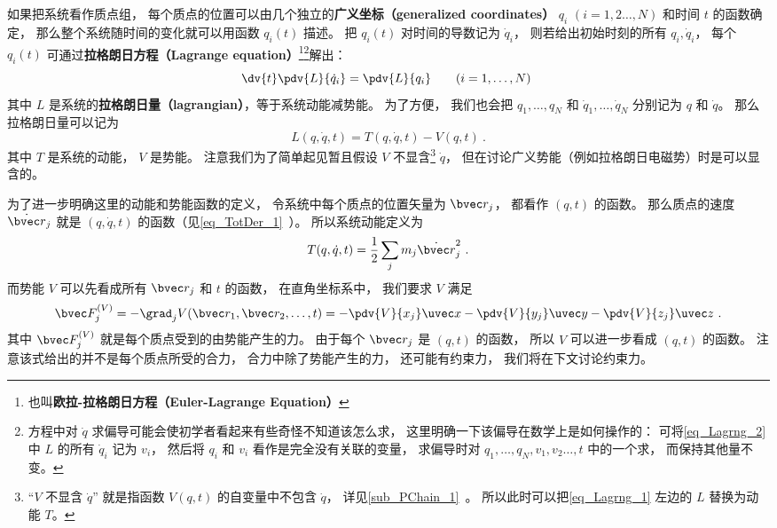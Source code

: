 

如果把系统看作质点组， 每个质点的位置可以由几个独立的\textbf{广义坐标（generalized coordinates）} $q_i$ $(i=1,2\dots,N)$ 和时间 $t$ 的函数确定， 那么整个系统随时间的变化就可以用函数 $q_i(t)$ 描述。 把 $q_i(t)$ 对时间的导数记为 $\dot q_i$， 则若给出初始时刻的所有 $q_i, \dot q_i$， 每个 $q_i(t)$ 可通过\textbf{拉格朗日方程（Lagrange equation）}\footnote{也叫\textbf{欧拉-拉格朗日方程（Euler-Lagrange Equation）}}\footnote{方程中对 $\dot q$ 求偏导可能会使初学者看起来有些奇怪不知道该怎么求， 这里明确一下该偏导在数学上是如何操作的： 可将\autoref{eq_Lagrng_2} 中 $L$ 的所有 $\dot q_i$ 记为 $v_i$， 然后将 $q_i$ 和 $v_i$ 看作是完全没有关联的变量， 求偏导时对 $q_1,\dots, q_N, v_1, v_2\dots,t$ 中的一个求， 而保持其他量不变。}解出：
\begin{equation}\label{eq_Lagrng_1}
\dv{t} \pdv{L}{\dot q_i} = \pdv{L}{q_i}
\qquad (i=1,\dots,N)~
\end{equation}
其中 $L$ 是系统的\textbf{拉格朗日量（lagrangian）}，等于系统动能减势能。 为了方便， 我们也会把 $q_1, \dots, q_N$ 和 $\dot q_1,\dots,\dot q_N$ 分别记为 $q$ 和 $\dot q$。 那么拉格朗日量可以记为
\begin{equation}\label{eq_Lagrng_2}
L(q, \dot q, t) = T(q, \dot q, t) - V(q, t)~.
\end{equation}
其中 $T$ 是系统的动能， $V$ 是势能。 注意我们为了简单起见暂且假设 $V$ 不显含\footnote{“$V$ 不显含 $\dot q$” 就是指函数 $V(q,t)$ 的自变量中不包含 $\dot q$， 详见\autoref{sub_PChain_1}~。 所以此时可以把\autoref{eq_Lagrng_1} 左边的 $L$ 替换为动能 $T$。} $\dot q$， 但在讨论广义势能（例如拉格朗日电磁势）时是可以显含的。

为了进一步明确这里的动能和势能函数的定义， 令系统中每个质点的位置矢量为 $\bvec r_j$， 都看作 $(q, t)$ 的函数。 那么质点的速度 $\dot{\bvec r}_j$ 就是 $(q,\dot q, t)$ 的函数（见\autoref{eq_TotDer_1}~）。 所以系统动能定义为
\begin{equation}
T(q, \dot q, t) = \frac{1}{2}\sum_j m_j\dot {\bvec r}_j^2~.
\end{equation}
而势能 $V$ 可以先看成所有 $\bvec r_j$ 和 $t$ 的函数， 在直角坐标系中， 我们要求 $V$ 满足
\begin{equation}
\bvec F_j^{(V)} = - \grad_j V(\bvec r_1,\bvec r_2, \dots, t) = -\pdv{V}{x_j}\uvec x - \pdv{V}{y_j}\uvec y - \pdv{V}{z_j} \uvec z~.
\end{equation}
其中 $\bvec F_j^{(V)}$ 就是每个质点受到的由势能产生的力。 由于每个 $\bvec r_j$ 是 $(q, t)$ 的函数， 所以 $V$ 可以进一步看成 $(q, t)$ 的函数。 注意该式给出的并不是每个质点所受的合力， 合力中除了势能产生的力， 还可能有约束力， 我们将在下文讨论约束力。

